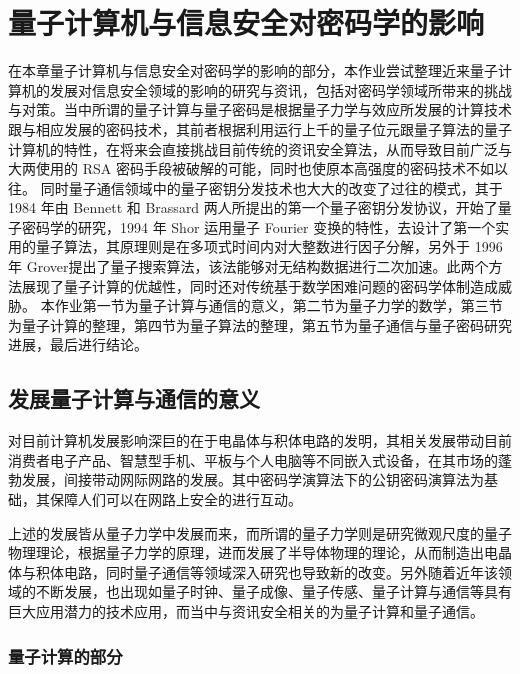 \chapter{量子计算机与信息安全对密码学的影响}
\label{chap:2}

在本章量子计算机与信息安全对密码学的影响的部分，本作业尝试整理近来量子计算机的发展对信息安全领域的影响的研究与资讯，包括对密码学领域所带来的挑战与对策。当中所谓的量子计算与量子密码是根据量子力学与效应所发展的计算技术跟与相应发展的密码技术，其前者根据利用运行上千的量子位元跟量子算法的量子计算机的特性，在将来会直接挑战目前传统的资讯安全算法，从而导致目前广泛与大两使用的 RSA 密码手段被破解的可能，同时也使原本高强度的密码技术不如以往。
同时量子通信领域中的量子密钥分发技术也大大的改变了过往的模式，其于 1984 年由 Bennett 和 Brassard 两人所提出的第一个量子密钥分发协议，开始了量子密码学的研究，1994 年 Shor 运用量子 Fourier 变换的特性，去设计了第一个实用的量子算法，其原理则是在多项式时间内对大整数进行因子分解，另外于 1996 年 Grover提出了量子搜索算法，该法能够对无结构数据进行二次加速。此两个方法展现了量子计算的优越性，同时还对传统基于数学困难问题的密码学体制造成威胁。
本作业第一节为量子计算与通信的意义，第二节为量子力学的数学，第三节为量子计算的整理，第四节为量子算法的整理，第五节为量子通信与量子密码研究进展，最后进行结论。


\section{发展量子计算与通信的意义}

对目前计算机发展影响深巨的在于电晶体与积体电路的发明，其相关发展带动目前消费者电子产品、智慧型手机、平板与个人电脑等不同嵌入式设备，在其市场的蓬勃发展，间接带动网际网路的发展。其中密码学演算法下的公钥密码演算法为基础，其保障人们可以在网路上安全的进行互动。

上述的发展皆从量子力学中发展而来，而所谓的量子力学则是研究微观尺度的量子物理理论，根据量子力学的原理，进而发展了半导体物理的理论，从而制造出电晶体与积体电路，同时量子通信等领域深入研究也导致新的改变。另外随着近年该领域的不断发展，也出现如量子时钟、量子成像、量子传感、量子计算与通信等具有巨大应用潜力的技术应用，而当中与资讯安全相关的为量子计算和量子通信。

\subsection{量子计算的部分}

